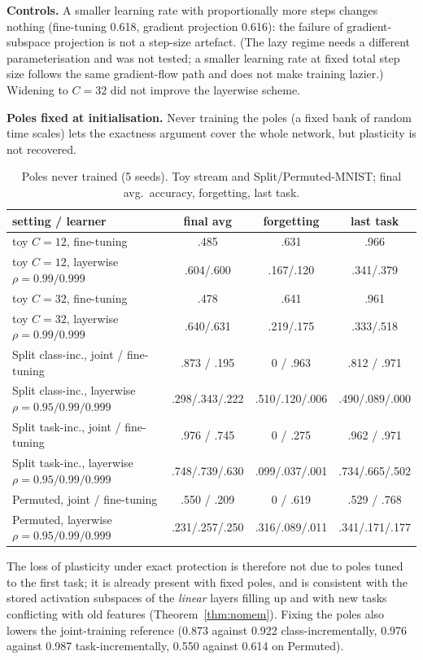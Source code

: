 \textbf{Controls.} A smaller learning rate with proportionally more steps changes nothing (fine-tuning 0.618, gradient projection 0.616): the failure of gradient-subspace projection is not a step-size artefact. (The lazy regime needs a different parameterisation and was not tested; a smaller learning rate at fixed total step size follows the same gradient-flow path and does not make training lazier.) Widening to $C=32$ did not improve the layerwise scheme.

\textbf{Poles fixed at initialisation.} Never training the poles (a fixed bank of random time scales) lets the exactness argument cover the whole network, but plasticity is not recovered.
\begin{table}[!htbp]
  \caption{Poles never trained (5 seeds). Toy stream and Split/Permuted-MNIST; final avg.\ accuracy, forgetting, last task.}
  \centering\scriptsize\setlength{\tabcolsep}{3.5pt}
  \begin{tabular}{>{\raggedright\arraybackslash}p{4.3cm}ccc}
    \toprule
    setting / learner & final avg & forgetting & last task \\
    \midrule
    toy $C{=}12$, fine-tuning & .485 & .631 & .966 \\
    toy $C{=}12$, layerwise $\rho=0.99/0.999$ & .604/.600 & .167/.120 & .341/.379 \\
    toy $C{=}32$, fine-tuning & .478 & .641 & .961 \\
    toy $C{=}32$, layerwise $\rho=0.99/0.999$ & .640/.631 & .219/.175 & .333/.518 \\
    Split class-inc., joint / fine-tuning & .873 / .195 & 0 / .963 & .812 / .971 \\
    Split class-inc., layerwise $\rho=0.95/0.99/0.999$ & .298/.343/.222 & .510/.120/.006 & .490/.089/.000 \\
    Split task-inc., joint / fine-tuning & .976 / .745 & 0 / .275 & .962 / .971 \\
    Split task-inc., layerwise $\rho=0.95/0.99/0.999$ & .748/.739/.630 & .099/.037/.001 & .734/.665/.502 \\
    Permuted, joint / fine-tuning & .550 / .209 & 0 / .619 & .529 / .768 \\
    Permuted, layerwise $\rho=0.95/0.99/0.999$ & .231/.257/.250 & .316/.089/.011 & .341/.171/.177 \\
    \bottomrule
  \end{tabular}
\end{table}
The loss of plasticity under exact protection is therefore not due to poles tuned to the first task; it is already present with fixed poles, and is consistent with the stored activation subspaces of the \emph{linear} layers filling up and with new tasks conflicting with old features (Theorem~\ref{thm:nomem}). Fixing the poles also lowers the joint-training reference (0.873 against 0.922 class-incrementally, 0.976 against 0.987 task-incrementally, 0.550 against 0.614 on Permuted).

